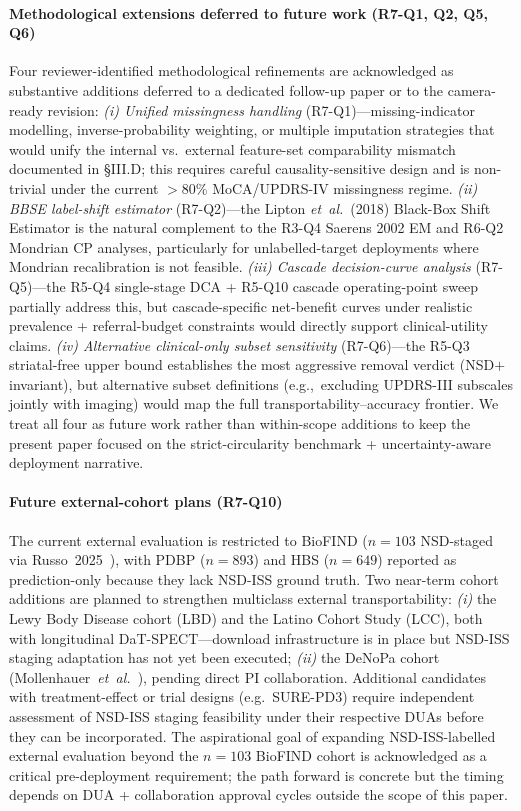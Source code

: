 \documentclass[10pt,letterpaper]{article}
\begin{document}
\paragraph*{Methodological extensions deferred to future work (R7-Q1, Q2, Q5, Q6)} Four reviewer-identified methodological refinements are acknowledged as substantive additions deferred to a dedicated follow-up paper or to the camera-ready revision: \textit{(i) Unified missingness handling} (R7-Q1)---missing-indicator modelling, inverse-probability weighting, or multiple imputation strategies that would unify the internal vs.\ external feature-set comparability mismatch documented in §III.D; this requires careful causality-sensitive design and is non-trivial under the current $>$80\% MoCA/UPDRS-IV missingness regime. \textit{(ii) BBSE label-shift estimator} (R7-Q2)---the Lipton \emph{et~al.}~(2018) Black-Box Shift Estimator is the natural complement to the R3-Q4 Saerens 2002 EM and R6-Q2 Mondrian CP analyses, particularly for unlabelled-target deployments where Mondrian recalibration is not feasible. \textit{(iii) Cascade decision-curve analysis} (R7-Q5)---the R5-Q4 single-stage DCA + R5-Q10 cascade operating-point sweep partially address this, but cascade-specific net-benefit curves under realistic prevalence + referral-budget constraints would directly support clinical-utility claims. \textit{(iv) Alternative clinical-only subset sensitivity} (R7-Q6)---the R5-Q3 striatal-free upper bound establishes the most aggressive removal verdict (NSD$+$ invariant), but alternative subset definitions (e.g.,\ excluding UPDRS-III subscales jointly with imaging) would map the full transportability--accuracy frontier. We treat all four as future work rather than within-scope additions to keep the present paper focused on the strict-circularity benchmark + uncertainty-aware deployment narrative.

\paragraph*{Future external-cohort plans (R7-Q10)} The current external evaluation is restricted to BioFIND ($n{=}103$ NSD-staged via Russo~2025~\cite{russo2025}), with PDBP ($n{=}893$) and HBS ($n{=}649$) reported as prediction-only because they lack NSD-ISS ground truth. Two near-term cohort additions are planned to strengthen multiclass external transportability: \textit{(i)} the Lewy Body Disease cohort (LBD) and the Latino Cohort Study (LCC), both with longitudinal DaT-SPECT---download infrastructure is in place but NSD-ISS staging adaptation has not yet been executed; \textit{(ii)} the DeNoPa cohort (Mollenhauer~\textit{et~al.}~\cite{mollenhauer2017}), pending direct PI collaboration. Additional candidates with treatment-effect or trial designs (e.g.~SURE-PD3) require independent assessment of NSD-ISS staging feasibility under their respective DUAs before they can be incorporated. The aspirational goal of expanding NSD-ISS-labelled external evaluation beyond the $n{=}103$ BioFIND cohort is acknowledged as a critical pre-deployment requirement; the path forward is concrete but the timing depends on DUA + collaboration approval cycles outside the scope of this paper.
\end{document}
